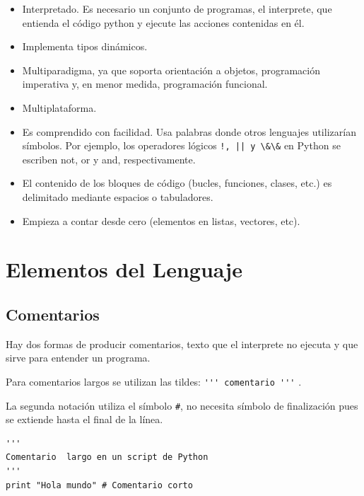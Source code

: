 \normalmarginpar
\begin{itemize}
\item Interpretado. Es necesario un conjunto de programas, 
el interprete, que entienda el código python y ejecute las acciones contenidas en él.
\item Implementa  tipos dinámicos.
\item  Multiparadigma, ya que soporta orientación a objetos, programación imperativa y, en menor medida, programación funcional.
\item Multiplataforma.

\item Es comprendido  con facilidad. Usa  palabras donde otros lenguajes utilizarían símbolos. Por ejemplo, los operadores lógicos \verb~!, || y \&\&~ en Python se escriben not, or y and, respectivamente.


\item  El contenido de los bloques de código (bucles, funciones, clases, etc.) es delimitado mediante espacios o tabuladores.

\item Empieza a contar desde cero (elementos en listas, vectores, etc).



\end{itemize}




\section{Elementos del Lenguaje}

\subsection{Comentarios}

Hay dos formas de producir comentarios, texto que el interprete  no ejecuta y que sirve para entender un programa.

Para comentarios largos se utilizan las tildes: \linebreak\verb~''' comentario '''~ .


 La segunda notación utiliza el símbolo \verb~#~, no necesita símbolo de finalización 
 pues se extiende hasta el final de la línea.

 \begin{lstlisting}
'''
Comentario  largo en un script de Python
'''
print "Hola mundo" # Comentario corto
\end{lstlisting}


